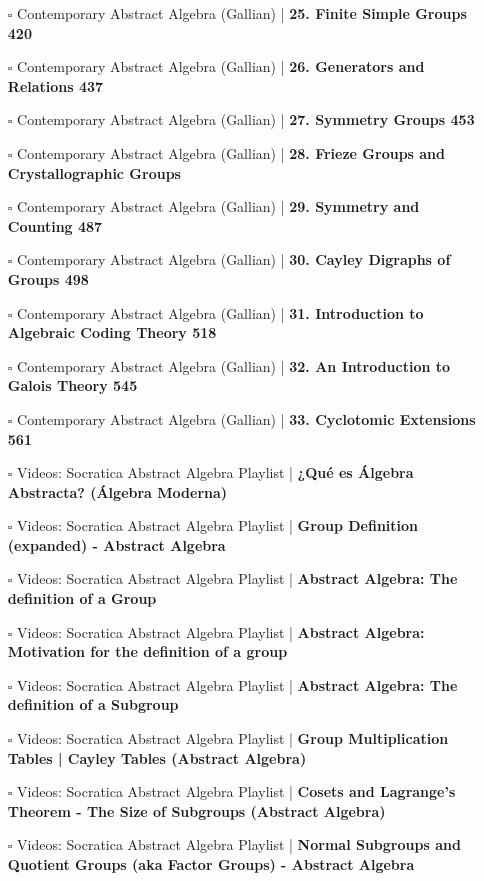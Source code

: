 \documentclass[a4, landscape, 12pt]{article}
\newcommand{\checkbox}{$\square$}%
\begin{document}
\begin{itemize}
{}
\item [\checkbox] Contemporary Abstract Algebra (Gallian)  | \textbf{25. Finite Simple Groups 420
}
\item [\checkbox] Contemporary Abstract Algebra (Gallian)  | \textbf{26. Generators and Relations 437
}
\item [\checkbox] Contemporary Abstract Algebra (Gallian)  | \textbf{27. Symmetry Groups 453
}
\item [\checkbox] Contemporary Abstract Algebra (Gallian)  | \textbf{28. Frieze Groups and Crystallographic Groups
}
\item [\checkbox] Contemporary Abstract Algebra (Gallian)  | \textbf{29. Symmetry and Counting 487
}
\item [\checkbox] Contemporary Abstract Algebra (Gallian)  | \textbf{30. Cayley Digraphs of Groups 498
}
\item [\checkbox] Contemporary Abstract Algebra (Gallian)  | \textbf{31. Introduction to Algebraic Coding Theory 518
}
\item [\checkbox] Contemporary Abstract Algebra (Gallian)  | \textbf{32. An Introduction to Galois Theory 545
}
\item [\checkbox] Contemporary Abstract Algebra (Gallian)  | \textbf{33. Cyclotomic Extensions 561
}
\item [\checkbox] Videos: Socratica Abstract Algebra Playlist  | \textbf{¿Qué es Álgebra Abstracta? (Álgebra Moderna)
}
\item [\checkbox] Videos: Socratica Abstract Algebra Playlist  | \textbf{Group Definition (expanded) - Abstract Algebra
}
\item [\checkbox] Videos: Socratica Abstract Algebra Playlist  | \textbf{Abstract Algebra: The definition of a Group
}
\item [\checkbox] Videos: Socratica Abstract Algebra Playlist  | \textbf{Abstract Algebra: Motivation for the definition of a group
}
\item [\checkbox] Videos: Socratica Abstract Algebra Playlist  | \textbf{Abstract Algebra: The definition of a Subgroup
}
\item [\checkbox] Videos: Socratica Abstract Algebra Playlist  | \textbf{Group Multiplication Tables | Cayley Tables (Abstract Algebra)
}
\item [\checkbox] Videos: Socratica Abstract Algebra Playlist  | \textbf{Cosets and Lagrange’s Theorem - The Size of Subgroups (Abstract Algebra)
}
\item [\checkbox] Videos: Socratica Abstract Algebra Playlist  | \textbf{Normal Subgroups and Quotient Groups (aka Factor Groups) - Abstract Algebra
}
\end{itemize}
\end{document}
